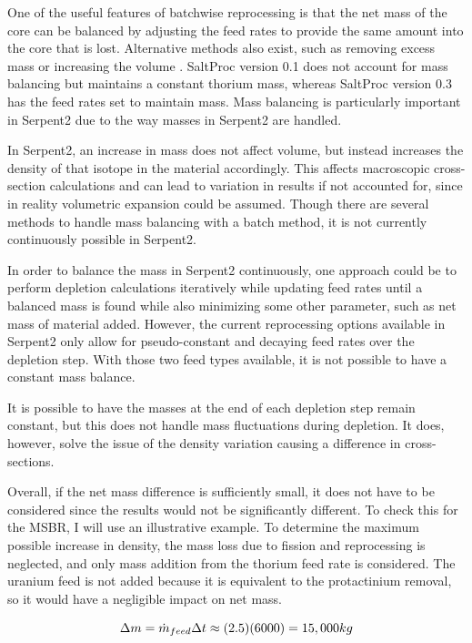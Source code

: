 One of the useful features of batchwise reprocessing is that the net mass of the core can be balanced by adjusting the feed rates to provide the same amount into the core that is lost. Alternative methods also exist, such as removing excess mass or increasing the volume \cite{ridley_method_2017}. SaltProc version 0.1 does not account for mass balancing but maintains a constant thorium mass, whereas SaltProc version 0.3 has the feed rates set to maintain mass. Mass balancing is particularly important in Serpent2 due to the way masses in Serpent2 are handled.

In Serpent2, an increase in mass does not affect volume, but instead increases the density of that isotope in the material accordingly. This affects macroscopic cross-section calculations and can lead to variation in results if not accounted for, since in reality volumetric expansion could be assumed. Though there are several methods to handle mass balancing with a batch method, it is not currently continuously possible in Serpent2.

In order to balance the mass in Serpent2 continuously, one approach could be to perform depletion calculations iteratively while updating feed rates until a balanced mass is found while also minimizing some other parameter, such as net mass of material added. However, the current reprocessing options available in Serpent2 only allow for pseudo-constant and decaying feed rates over the depletion step. With those two feed types available, it is not possible to have a constant mass balance.

It is possible to have the masses at the end of each depletion step remain constant, but this does not handle mass fluctuations during depletion. It does, however, solve the issue of the density variation causing a difference in cross-sections.

Overall, if the net mass difference is sufficiently small, it does not have to be considered since the results would not be significantly different. To check this for the MSBR, I will use an illustrative example. To determine the maximum possible increase in density, the mass loss due to fission and reprocessing is neglected, and only mass addition from the thorium feed rate is considered. The uranium feed is not added because it is equivalent to the protactinium removal, so it would have a negligible impact on net mass. 

\begin{equation} \hfill
\Delta m = \Dot{m}_{feed} \Delta t \approx (2.5)(6000) = 15,000 kg
\hfill\label{eq:m_gain} \end{equation}

